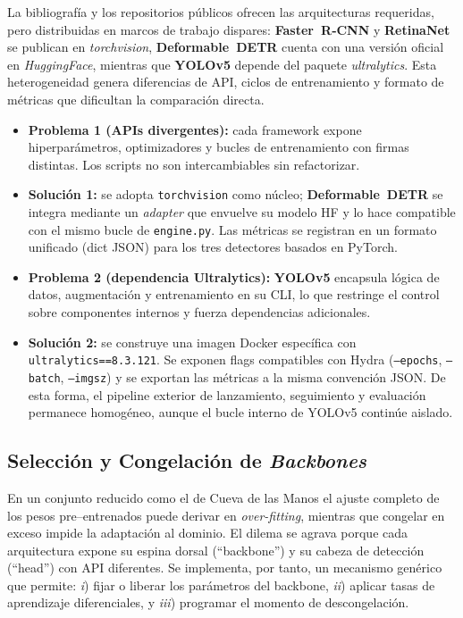 La bibliografía y los repositorios públicos ofrecen las arquitecturas requeridas, pero distribuidas en marcos de trabajo dispares:
\textbf{Faster~R‐CNN} y \textbf{RetinaNet} se publican en \textit{torchvision}, \textbf{Deformable~DETR} cuenta con una versión oficial en \textit{HuggingFace}, mientras que \textbf{YOLOv5} depende del paquete \textit{ultralytics}.
Esta heterogeneidad genera diferencias de API, ciclos de entrenamiento y formato de métricas que dificultan la comparación directa.

\begin{itemize}
   \item \textbf{Problema 1 (APIs divergentes):} cada framework expone hiperparámetros, optimizadores y bucles de entrenamiento con firmas distintas.
   Los scripts no son intercambiables sin refactorizar.
   \item \textbf{Solución 1:} se adopta \texttt{torchvision} como núcleo; \textbf{Deformable~DETR} se integra mediante un \emph{adapter} que envuelve su modelo HF y lo hace compatible con el mismo bucle de \texttt{engine.py}.
         Las métricas se registran en un formato unificado (dict JSON) para los tres detectores basados en PyTorch.
   \item \textbf{Problema 2 (dependencia Ultralytics):} \textbf{YOLOv5} encapsula lógica de datos, augmentación y entrenamiento en su CLI, lo que restringe el control sobre componentes internos y fuerza dependencias adicionales.
   \item \textbf{Solución 2:} se construye una imagen Docker específica con \texttt{ultralytics==8.3.121}.
         Se exponen flags compatibles con Hydra (\texttt{--epochs}, \texttt{--batch}, \texttt{--imgsz}) y se exportan las métricas a la misma convención JSON.
         De esta forma, el pipeline exterior de lanzamiento, seguimiento y evaluación permanece homogéneo, aunque el bucle interno de YOLOv5 continúe aislado.
\end{itemize}

\subsection{Selección y Congelación de \emph{Backbones}}\label{ssec:freeze}

En un conjunto reducido como el de Cueva de las Manos el ajuste completo de los pesos pre–entrenados puede derivar en \emph{over-fitting}, mientras que congelar en exceso impide la adaptación al dominio.
El dilema se agrava porque cada arquitectura expone su espina dorsal (“backbone”) y su cabeza de detección (“head”) con API diferentes.
Se implementa, por tanto, un mecanismo genérico que permite:
\emph{i}) fijar o liberar los parámetros del backbone,
\emph{ii}) aplicar tasas de aprendizaje diferenciales, y
\emph{iii}) programar el momento de descongelación.

